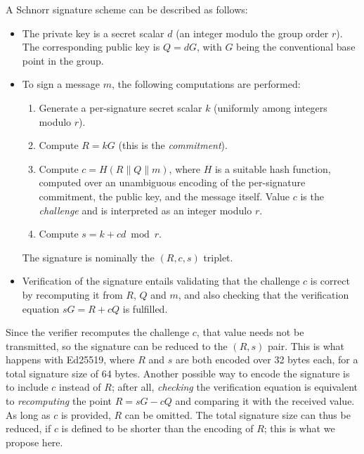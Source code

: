 \documentclass{llncs}
\begin{document}
A Schnorr signature scheme\cite{Sch1989} can be described as follows:
\begin{itemize}

    \item The private key is a secret scalar $d$ (an integer modulo the
    group order $r$). The corresponding public key is $Q = dG$, with $G$
    being the conventional base point in the group.

    \item To sign a message $m$, the following computations are performed:
    \begin{enumerate}

        \item Generate a per-signature secret scalar $k$ (uniformly among
        integers modulo $r$).

        \item Compute $R = kG$ (this is the \emph{commitment}).

        \item Compute $c = H(R \parallel Q \parallel m)$, where $H$ is
        a suitable hash function, computed over an unambiguous encoding
        of the per-signature commitment, the public key, and the message
        itself. Value $c$ is the \emph{challenge} and is interpreted as
        an integer modulo $r$.

        \item Compute $s = k + cd \bmod r$.

    \end{enumerate}
    The signature is nominally the $(R,c,s)$ triplet.

    \item Verification of the signature entails validating that the
    challenge $c$ is correct by recomputing it from $R$, $Q$ and $m$,
    and also checking that the verification equation $sG = R + cQ$
    is fulfilled.

\end{itemize}

Since the verifier recomputes the challenge $c$, that value needs not be
transmitted, so the signature can be reduced to the $(R,s)$ pair. This
is what happens with Ed25519, where $R$ and $s$ are both encoded over 32
bytes each, for a total signature size of 64 bytes. Another possible way
to encode the signature is to include $c$ instead of $R$; after all,
\emph{checking} the verification equation is equivalent to
\emph{recomputing} the point $R = sG - cQ$ and comparing it with the
received value. As long as $c$ is provided, $R$ can be omitted. The
total signature size can thus be reduced, if $c$ is defined to be
shorter than the encoding of $R$; this is what we propose here.
\end{document}
